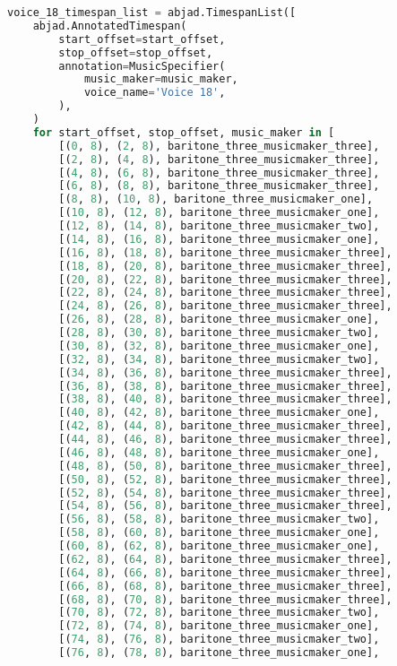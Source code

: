 \begin{lstlisting}[language=Python, caption=Invocation Source Code]
voice_18_timespan_list = abjad.TimespanList([
    abjad.AnnotatedTimespan(
        start_offset=start_offset,
        stop_offset=stop_offset,
        annotation=MusicSpecifier(
            music_maker=music_maker,
            voice_name='Voice 18',
        ),
    )
    for start_offset, stop_offset, music_maker in [
        [(0, 8), (2, 8), baritone_three_musicmaker_three],
        [(2, 8), (4, 8), baritone_three_musicmaker_three],
        [(4, 8), (6, 8), baritone_three_musicmaker_three],
        [(6, 8), (8, 8), baritone_three_musicmaker_three],
        [(8, 8), (10, 8), baritone_three_musicmaker_one],
        [(10, 8), (12, 8), baritone_three_musicmaker_one],
        [(12, 8), (14, 8), baritone_three_musicmaker_two],
        [(14, 8), (16, 8), baritone_three_musicmaker_one],
        [(16, 8), (18, 8), baritone_three_musicmaker_three],
        [(18, 8), (20, 8), baritone_three_musicmaker_three],
        [(20, 8), (22, 8), baritone_three_musicmaker_three],
        [(22, 8), (24, 8), baritone_three_musicmaker_three],
        [(24, 8), (26, 8), baritone_three_musicmaker_three],
        [(26, 8), (28, 8), baritone_three_musicmaker_one],
        [(28, 8), (30, 8), baritone_three_musicmaker_two],
        [(30, 8), (32, 8), baritone_three_musicmaker_one],
        [(32, 8), (34, 8), baritone_three_musicmaker_two],
        [(34, 8), (36, 8), baritone_three_musicmaker_three],
        [(36, 8), (38, 8), baritone_three_musicmaker_three],
        [(38, 8), (40, 8), baritone_three_musicmaker_three],
        [(40, 8), (42, 8), baritone_three_musicmaker_one],
        [(42, 8), (44, 8), baritone_three_musicmaker_three],
        [(44, 8), (46, 8), baritone_three_musicmaker_three],
        [(46, 8), (48, 8), baritone_three_musicmaker_one],
        [(48, 8), (50, 8), baritone_three_musicmaker_three],
        [(50, 8), (52, 8), baritone_three_musicmaker_three],
        [(52, 8), (54, 8), baritone_three_musicmaker_three],
        [(54, 8), (56, 8), baritone_three_musicmaker_three],
        [(56, 8), (58, 8), baritone_three_musicmaker_two],
        [(58, 8), (60, 8), baritone_three_musicmaker_one],
        [(60, 8), (62, 8), baritone_three_musicmaker_one],
        [(62, 8), (64, 8), baritone_three_musicmaker_three],
        [(64, 8), (66, 8), baritone_three_musicmaker_three],
        [(66, 8), (68, 8), baritone_three_musicmaker_three],
        [(68, 8), (70, 8), baritone_three_musicmaker_three],
        [(70, 8), (72, 8), baritone_three_musicmaker_two],
        [(72, 8), (74, 8), baritone_three_musicmaker_one],
        [(74, 8), (76, 8), baritone_three_musicmaker_two],
        [(76, 8), (78, 8), baritone_three_musicmaker_one],

\end{lstlisting}
